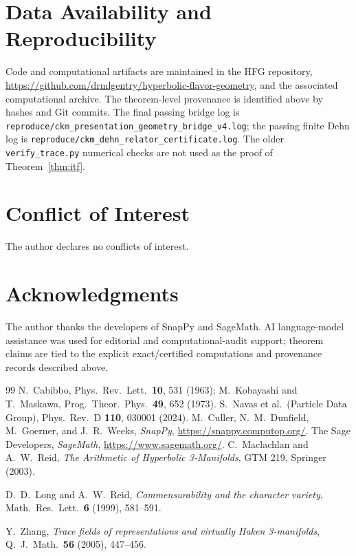 \documentclass[11pt]{article}
\begin{document}
\section*{Data Availability and Reproducibility}
Code and computational artifacts are maintained in the HFG repository,
\url{https://github.com/drmlgentry/hyperbolic-flavor-geometry}, and the
associated computational archive. The theorem-level provenance is identified above by hashes and
Git commits. The final passing bridge log is
\texttt{reproduce/ckm\_presentation\_geometry\_bridge\_v4.log}; the passing
finite Dehn log is
\texttt{reproduce/ckm\_dehn\_relator\_certificate.log}. The older
\texttt{verify\_trace.py} numerical checks are not used as the proof of
Theorem~\ref{thm:itf}.

\section*{Conflict of Interest}
The author declares no conflicts of interest.

\section*{Acknowledgments}
The author thanks the developers of SnapPy and SageMath. AI language-model
assistance was used for editorial and computational-audit support; theorem
claims are tied to the explicit exact/certified computations and provenance
records described above.

\begin{thebibliography}{99}
 N.~Cabibbo, Phys.\ Rev.\ Lett.\ \textbf{10}, 531 (1963);
M.~Kobayashi and T.~Maskawa, Prog.\ Theor.\ Phys.\ \textbf{49}, 652 (1973).
 S.~Navas et al.\ (Particle Data Group),
Phys.\ Rev.\ D \textbf{110}, 030001 (2024).
 M.~Culler, N.~M.~Dunfield, M.~Goerner, and J.~R.~Weeks,
\emph{SnapPy}, \url{https://snappy.computop.org/}.
 The Sage Developers, \emph{SageMath},
\url{https://www.sagemath.org/}.
 C.~Maclachlan and A.~W.~Reid,
\emph{The Arithmetic of Hyperbolic 3-Manifolds}, GTM 219, Springer (2003).

D.~D.~Long and A.~W.~Reid,
\emph{Commensurability and the character variety},
Math.\ Res.\ Lett.\ \textbf{6} (1999), 581--591.

Y.~Zhang,
\emph{Trace fields of representations and virtually Haken 3-manifolds},
Q.\ J.\ Math.\ \textbf{56} (2005), 447--456.

\end{thebibliography}
\end{document}
